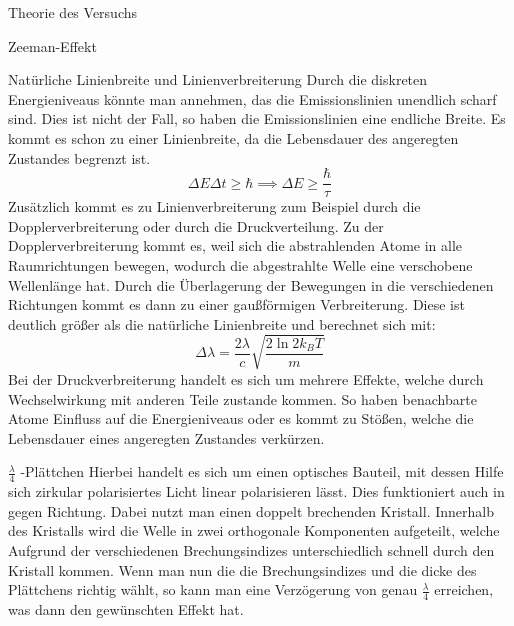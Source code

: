 \documentclass[pdftex, a4paper,11pt, twoside, ngerman]{report}
\begin{document}
\begin{chapter}{Theorie des Versuchs}
\begin{section}{Zeeman-Effekt}
      \begin{subsection}{Natürliche Linienbreite und Linienverbreiterung}
        Durch die diskreten Energieniveaus könnte man annehmen, das die
        Emissionslinien unendlich scharf sind. Dies ist nicht der Fall, so haben
        die Emissionslinien eine endliche Breite. Es kommt es schon zu einer
        Linienbreite, da die Lebensdauer des angeregten Zustandes begrenzt ist.
        \begin{equation}
          \label{eq:Linienbreite1}
          \Delta E\Delta t \geq \hbar \implies \Delta E \geq \frac \hbar\tau
        \end{equation}
        Zusätzlich kommt es zu Linienverbreiterung zum Beispiel durch die Dopplerverbreiterung oder durch die Druckverteilung.
        Zu der Dopplerverbreiterung kommt es, weil sich die abstrahlenden Atome
        in alle Raumrichtungen bewegen, wodurch die abgestrahlte Welle eine
        verschobene Wellenlänge hat. Durch die Überlagerung der Bewegungen in
        die verschiedenen Richtungen kommt es dann zu einer gaußförmigen
        Verbreiterung. Diese ist deutlich größer als die natürliche Linienbreite
        und berechnet sich mit:
        \begin{equation}
          \label{eq:Linienbreite2}
          \Delta\lambda = \frac{2\lambda}{c}\sqrt{\frac{2\ln 2k_B T}{m}}
        \end{equation}
        Bei der Druckverbreiterung handelt es sich um mehrere Effekte, welche
        durch Wechselwirkung mit anderen Teile zustande kommen. So haben
        benachbarte Atome Einfluss auf die Energieniveaus oder es kommt zu
        Stößen, welche die Lebensdauer eines angeregten Zustandes verkürzen.
        \cite{bib:Linienbreite}\cite{bib:Linienverbreiterung}
        
        \end{subsection}
      
      
      
      \begin{subsection}{$\frac{\lambda}{4}$ -Plättchen}
        Hierbei handelt es sich um einen optisches Bauteil, mit dessen Hilfe
        sich zirkular polarisiertes Licht linear polarisieren lässt. Dies
        funktioniert auch in gegen Richtung. Dabei nutzt man einen doppelt
        brechenden Kristall. Innerhalb des Kristalls wird die Welle in zwei
        orthogonale Komponenten aufgeteilt, welche Aufgrund der verschiedenen
        Brechungsindizes unterschiedlich schnell durch den Kristall kommen.
        Wenn man nun die die Brechungsindizes und die dicke des Plättchens
        richtig wählt, so kann man eine Verzögerung von genau $\frac \lambda 4$
        erreichen, was dann den gewünschten Effekt hat.
        

\end{subsection}
\end{section}
\end{chapter}
\end{document}
